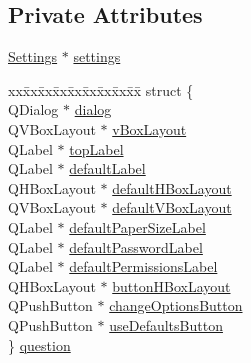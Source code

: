 \subsection*{Private Attributes}
\begin{CompactItemize}
\item 
\hyperlink{classSettings}{Settings} $\ast$ \hyperlink{classPDFOptions_r0}{settings}
\item 
\begin{tabbing}
xx\=xx\=xx\=xx\=xx\=xx\=xx\=xx\=xx\=\kill
struct \{\\
\>QDialog $\ast$ \hyperlink{classPDFOptions_r1}{dialog}\\
\>QVBoxLayout $\ast$ \hyperlink{classPDFOptions_r2}{vBoxLayout}\\
\>QLabel $\ast$ \hyperlink{classPDFOptions_r3}{topLabel}\\
\>QLabel $\ast$ \hyperlink{classPDFOptions_r4}{defaultLabel}\\
\>QHBoxLayout $\ast$ \hyperlink{classPDFOptions_r5}{defaultHBoxLayout}\\
\>QVBoxLayout $\ast$ \hyperlink{classPDFOptions_r6}{defaultVBoxLayout}\\
\>QLabel $\ast$ \hyperlink{classPDFOptions_r7}{defaultPaperSizeLabel}\\
\>QLabel $\ast$ \hyperlink{classPDFOptions_r8}{defaultPasswordLabel}\\
\>QLabel $\ast$ \hyperlink{classPDFOptions_r9}{defaultPermissionsLabel}\\
\>QHBoxLayout $\ast$ \hyperlink{classPDFOptions_r10}{buttonHBoxLayout}\\
\>QPushButton $\ast$ \hyperlink{classPDFOptions_r11}{changeOptionsButton}\\
\>QPushButton $\ast$ \hyperlink{classPDFOptions_r12}{useDefaultsButton}\\
\} \hyperlink{classPDFOptions_r13}{question}\\


\end{tabbing}
\end{CompactItemize}
